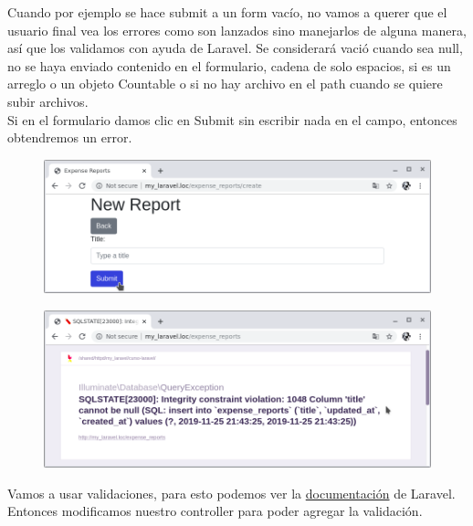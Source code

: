 \documentclass{article}
\begin{document}
Cuando por ejemplo se hace submit a un form vacío, no vamos a querer que el
usuario final vea los errores como son lanzados sino manejarlos de alguna
manera, así que los validamos con ayuda de Laravel. Se considerará vació cuando
sea null, no se haya enviado contenido en el formulario, cadena de solo
espacios, si es un arreglo o un objeto Countable o si no hay archivo en el
path cuando se quiere subir archivos.\\

Si en el formulario damos clic en Submit sin escribir nada en el campo,
entonces obtendremos un error.\\

\begin{figure}[h!]
  \centering
  \includegraphics[scale=0.5]{./Pictures/086_add_report_null.png}
\end{figure}

\begin{figure}[h!]
  \centering
  \includegraphics[scale=0.5]{./Pictures/087_add_report_null_error.png}
\end{figure}

Vamos a usar validaciones, para esto podemos ver la
\href{https://laravel.com/docs/6.x/validation#rule-required}{documentación} de
Laravel.\\

Entonces modificamos nuestro controller para poder agregar la validación.\\
\end{document}
